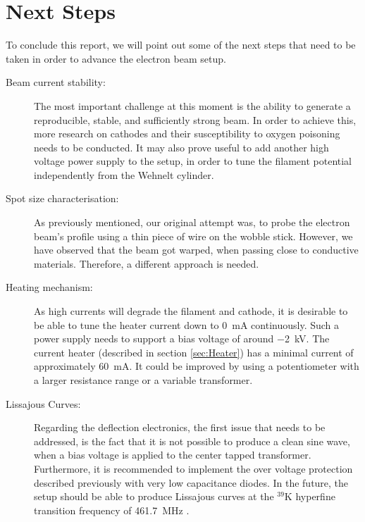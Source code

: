 
\chapter{Next Steps}
 
To conclude this report, we will point out some of the next steps that need to be taken in order to advance the electron beam setup. 

\begin{description}
	\item[Beam current stability:] The most important challenge at this moment is the ability to generate a reproducible, stable, and sufficiently strong beam. In order to achieve this, more research on cathodes and their susceptibility to oxygen poisoning needs to be conducted. It may also prove useful to add another high voltage power supply to the setup, in order to tune the filament potential independently from the Wehnelt cylinder. 
	\item[Spot size characterisation:] As previously mentioned, our original attempt was, to probe the electron beam's profile using a thin piece of wire on the wobble stick. However, we have observed that the beam got warped, when passing close to conductive materials. Therefore, a different approach is needed. 
	\item[Heating mechanism:] As high currents will degrade the filament and cathode, it is desirable to be able to tune the heater current down to \SI{0}{\milli\ampere} continuously. Such a power supply needs to support a bias voltage of around \SI{-2}{\kilo\volt}. The current heater (described in section \cref{sec:Heater}) has a minimal current of approximately \SI{60}{\milli\ampere}. It could be improved by using a potentiometer with a larger resistance range or a variable transformer. 
	\item[Lissajous Curves:] Regarding the deflection electronics, the first issue that needs to be addressed, is the fact that it is not possible to produce a clean sine wave, when a bias voltage is applied to the center tapped transformer. Furthermore, it is recommended to implement the over voltage protection described previously with very low capacitance diodes.  
	In the future, the setup should be able to produce Lissajous curves at the  $^{39}\mathrm{K}$ hyperfine transition frequency of \SI{461.7}{\mega\hertz} . 

\end{description}